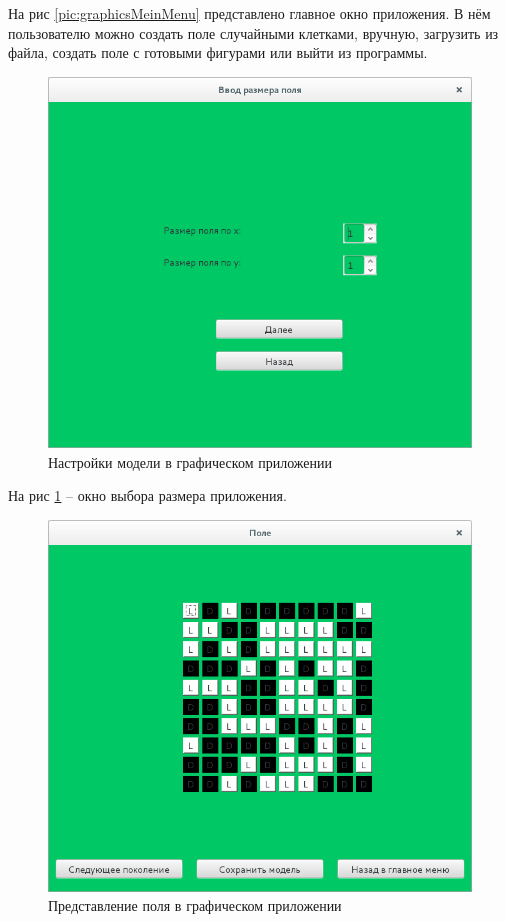 \documentclass[a4paper]{article}
\begin{document}
На рис \ref{pic:graphicsMeinMenu} представлено главное окно приложения. В нём пользователю можно создать поле случайными клетками, вручную, загрузить из файла, создать поле с готовыми фигурами или выйти из программы. 

\begin{figure}[H]
	\begin{center}
		\includegraphics[scale=0.5]{gui2}
		\caption{Настройки модели в графическом приложении} 
		\label{pic:graphicsSizeMenu} %
	\end{center}
\end{figure}

На рис \ref{pic:graphicsSizeMenu} – окно выбора размера приложения.

\begin{figure}[H]
	\begin{center}
		\includegraphics[scale=0.5]{gui3}
		\caption{Представление поля в графическом приложении} 
		\label{pic:field} %
	\end{center}
\end{figure}
\end{document}
